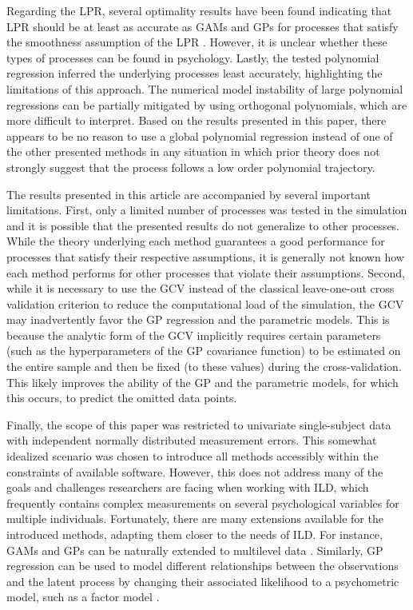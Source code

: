 \documentclass[man, floatsintext]{apa7}
\begin{document}
Regarding the LPR, several optimality results have been found indicating that
LPR should be at least as accurate as GAMs and GPs for processes that satisfy
the smoothness assumption of the LPR \parencite{fan_local_1997}. However, it is
unclear whether these types of processes can be found in psychology. Lastly,
the tested polynomial regression inferred the underlying processes least
accurately, highlighting the limitations of this approach. The numerical model
instability of large polynomial regressions can be partially mitigated by using
orthogonal polynomials, which are more difficult to interpret. Based on
the results presented in this paper, there appears to be no reason to use a
global polynomial regression instead of one of the other presented methods in
any situation in which prior theory does not strongly suggest that the process
follows a low order polynomial trajectory.

The results presented in this article are accompanied by several important
limitations. First, only a limited number of processes was tested in the
simulation and it is possible that the presented results do not generalize to
other processes. While the theory underlying each method guarantees a good
performance for processes that satisfy their respective assumptions, it is
generally not known how each method performs for other processes that violate
their assumptions. Second, while it is necessary to use the GCV instead of the
classical leave-one-out cross validation criterion to reduce the computational
load of the simulation, the GCV may inadvertently favor the GP regression and
the parametric models. This is because the analytic form of the GCV
implicitly requires certain parameters (such as the hyperparameters of the GP
covariance function) to be estimated on the entire sample and then be fixed (to
these values) during the cross-validation. This likely improves the ability of
the GP and the parametric models, for which this occurs, to predict the
omitted data points.

Finally, the scope of this paper was restricted to univariate single-subject
data with independent normally distributed measurement errors. This somewhat
idealized scenario was chosen to introduce all methods accessibly within the
constraints of available software. However, this does not address many of the
goals and challenges researchers are facing when working with ILD, which
frequently contains complex measurements on several psychological variables for
multiple individuals. Fortunately, there are many extensions available for the
introduced methods, adapting them closer to the needs of ILD\@. For instance,
GAMs and GPs can be naturally extended to multilevel data
\parencite{karch_gaussian_2020, wood_generalized_2006}. Similarly, GP
regression can be used to model different relationships between the
observations and the latent process by changing their associated likelihood to
a psychometric model, such as a factor model \parencite{clark_dynamic_2023,
  yu_gaussian-process_2009}.
\end{document}
